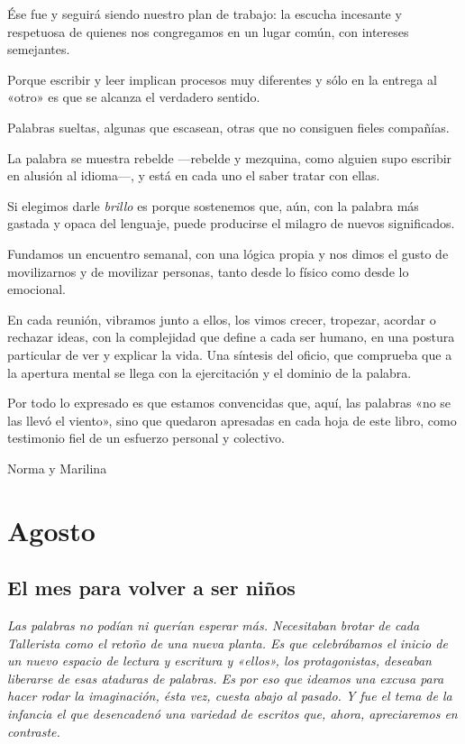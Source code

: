 \documentclass[11pt,twoside,openright,a5paper]{book}
\begin{document}
Ése fue y seguirá siendo nuestro plan de trabajo: la escucha incesante y respetuosa de quienes nos congregamos en un lugar común, con intereses  semejantes.

Porque escribir y leer implican procesos muy diferentes y sólo en la entrega al «otro» es que se alcanza el verdadero sentido.

Palabras sueltas, algunas que escasean, otras que no consiguen fieles compañías. 

La palabra se muestra rebelde ---rebelde y mezquina, como alguien supo escribir en alusión al idioma---, y está en cada uno el saber tratar con ellas.

Si elegimos darle \emph{brillo} es porque sostenemos que, aún, con la palabra más gastada y opaca del lenguaje, puede producirse el milagro de nuevos significados.

Fundamos un encuentro semanal, con una lógica propia y nos dimos el gusto de movilizarnos y de movilizar personas, tanto desde lo físico como desde  lo emocional.

En cada reunión, vibramos  junto  a ellos, los vimos crecer, tropezar, acordar o rechazar ideas, con la complejidad que define a cada ser humano, en una postura particular de ver y explicar la vida. Una síntesis del oficio, que comprueba que a la apertura mental se  llega con la ejercitación y el dominio de la palabra.

Por todo lo expresado es que estamos convencidas que, aquí,  las palabras «no se las llevó el viento», sino  que quedaron apresadas en cada hoja de este libro, como testimonio fiel de un esfuerzo personal y colectivo.

\begin{flushright}Norma y Marilina\end{flushright}

\part*{Agosto}
\chapter*{El mes para volver a ser niños}

\vspace{0.5cm}
\emph{Las palabras no podían ni querían esperar más. Necesitaban brotar de cada Tallerista como el retoño de una nueva planta. Es que celebrábamos el inicio de un nuevo espacio de lectura y escritura y «ellos», los protagonistas, deseaban liberarse de esas \emph{ataduras} de palabras. Es por eso que ideamos una excusa para hacer rodar la imaginación, ésta vez, cuesta abajo al pasado. Y fue el tema de la infancia el que desencadenó una variedad de escritos que, ahora, apreciaremos en contraste.}
\end{document}
